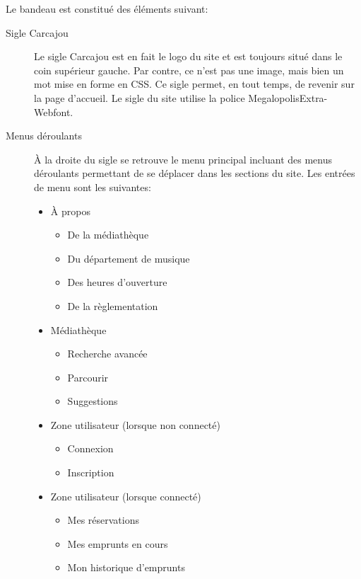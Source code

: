 \documentclass[letter, 11pt]{report}
\begin{document}
Le bandeau est constitué des éléments suivant:
\begin{description}
	\item[Sigle Carcajou] Le sigle Carcajou est en fait le logo du site et est toujours situé dans le coin supérieur gauche. Par contre, ce n'est pas une image, mais bien un mot mise en forme en CSS. Ce sigle permet, en tout temps, de revenir sur la page d'accueil. Le sigle du site utilise la police MegalopolisExtra-Webfont.
	\item[Menus déroulants]À la droite du sigle se retrouve le menu principal incluant des menus déroulants permettant de se déplacer dans les sections du site. Les entrées de menu sont les suivantes:
		\begin{itemize}
			\item À propos
			\begin{itemize}
				\item De la médiathèque
				\item Du département de musique
				\item Des heures d'ouverture
				\item De la règlementation
			\end{itemize}
		\end{itemize}
		\begin{itemize}
			\item Médiathèque
			\begin{itemize}
				\item Recherche avancée
				\item Parcourir
				\item Suggestions
			\end{itemize}
		\end{itemize}
		\begin{itemize}
			\item Zone utilisateur (lorsque non connecté)
			\begin{itemize}
				\item Connexion
				\item Inscription
			\end{itemize}
		\end{itemize}
		\begin{itemize}
			\item Zone utilisateur (lorsque connecté)
			\begin{itemize}
				\item Mes réservations
				\item Mes emprunts en cours
				\item Mon historique d'emprunts

\end{itemize}
\end{itemize}
\end{description}
\end{document}
